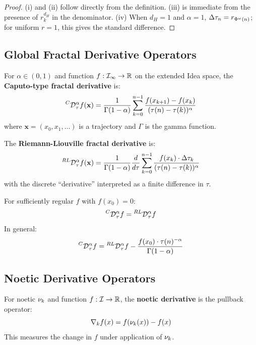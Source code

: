 \begin{proof}
(i) and (ii) follow directly from the definition. (iii) is immediate from the presence of $r_k^{d_H}$ in the denominator. (iv) When $d_H = 1$ and $\alpha = 1$, $\Delta \tau_n = r_{\Phi^{\omega}(n)}$; for uniform $r = 1$, this gives the standard difference.
\end{proof}

\subsection{Global Fractal Derivative Operators}

\begin{definition}
\label{def:caputo-fractal}
For $\alpha \in (0, 1)$ and function $f : \mathcal{I}_\infty \to \mathbb{R}$ on the extended Idea space, the \textbf{Caputo-type fractal derivative} is:
\[
\prescript{C}{}{\mathcal{D}}^\alpha_\tau f(\mathbf{x}) = \frac{1}{\Gamma(1-\alpha)} \sum_{k=0}^{n-1} \frac{f(x_{k+1}) - f(x_k)}{(\tau(n) - \tau(k))^\alpha}
\]
where $\mathbf{x} = (x_0, x_1, \ldots)$ is a trajectory and $\Gamma$ is the gamma function.
\end{definition}

\begin{definition}
\label{def:rl-fractal}
The \textbf{Riemann-Liouville fractal derivative} is:
\[
\prescript{RL}{}{\mathcal{D}}^\alpha_\tau f(\mathbf{x}) = \frac{1}{\Gamma(1-\alpha)} \frac{d}{d\tau} \sum_{k=0}^{n-1} \frac{f(x_k) \cdot \Delta\tau_k}{(\tau(n) - \tau(k))^\alpha}
\]
with the discrete ``derivative'' interpreted as a finite difference in $\tau$.
\end{definition}

\begin{theorem}
\label{thm:fractal-deriv-relationship}
For sufficiently regular $f$ with $f(x_0) = 0$:
\[
\prescript{C}{}{\mathcal{D}}^\alpha_\tau f = \prescript{RL}{}{\mathcal{D}}^\alpha_\tau f
\]
In general:
\[
\prescript{C}{}{\mathcal{D}}^\alpha_\tau f = \prescript{RL}{}{\mathcal{D}}^\alpha_\tau f - \frac{f(x_0) \cdot \tau(n)^{-\alpha}}{\Gamma(1-\alpha)}
\]
\end{theorem}

\subsection{Noetic Derivative Operators}

\begin{definition}
\label{def:noetic-derivative}
For noetic $\nu_{k}$ and function $f : \mathcal{I} \to \mathbb{R}$, the \textbf{noetic derivative} is the pullback operator:
\[
\nabla_k f(x) = f(\nu_{k}(x)) - f(x)
\]
This measures the change in $f$ under application of $\nu_{k}$.
\end{definition}

